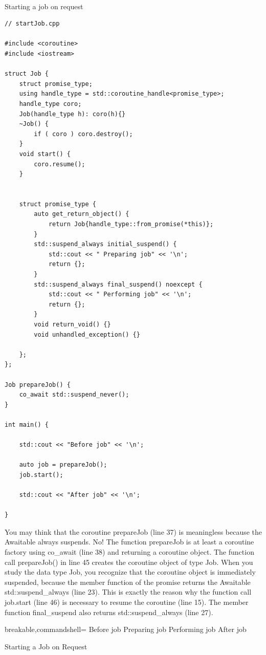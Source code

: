 \hspace*{\fill} \\ %
\noindent
Starting a job on request
\begin{lstlisting}[style=styleCXX]
// startJob.cpp

#include <coroutine>
#include <iostream>

struct Job {
	struct promise_type;
	using handle_type = std::coroutine_handle<promise_type>;
	handle_type coro;
	Job(handle_type h): coro(h){}
	~Job() {
		if ( coro ) coro.destroy();
	}
	void start() {
		coro.resume();
	}


	struct promise_type {
		auto get_return_object() {
			return Job{handle_type::from_promise(*this)};
		}
		std::suspend_always initial_suspend() {
			std::cout << " Preparing job" << '\n';
			return {};
		}
		std::suspend_always final_suspend() noexcept {
			std::cout << " Performing job" << '\n';
			return {};
		}
		void return_void() {}
		void unhandled_exception() {}
	
	};
};

Job prepareJob() {
	co_await std::suspend_never();
}

int main() {

	std::cout << "Before job" << '\n';
	
	auto job = prepareJob();
	job.start();
	
	std::cout << "After job" << '\n';

}
\end{lstlisting}

You may think that the coroutine prepareJob (line 37) is meaningless because the Awaitable always suspends. No! The function prepareJob is at least a coroutine factory using co\_await (line 38) and returning a coroutine object. The function call prepareJob() in line 45 creates the coroutine object of type Job. When you study the data type Job, you recognize that the coroutine object is immediately suspended, because the member function of the promise returns the Awaitable std::suspend\_always (line 23). This is exactly the reason why the function call job.start (line 46) is necessary to resume the coroutine (line 15). The member function final\_suspend also returns std::suspend\_always (line 27).

\begin{tcblisting}{breakable,commandshell={}}
Before job
    Preparing job
    Performing job
After job
\end{tcblisting}

\begin{center}
Starting a Job on Request
\end{center}

